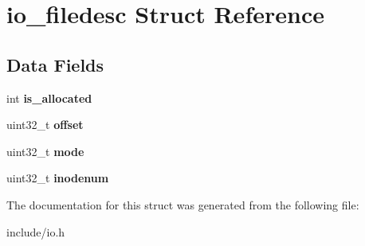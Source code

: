 \hypertarget{structio__filedesc}{}\section{io\+\_\+filedesc Struct Reference}
\label{structio__filedesc}
\subsection*{Data Fields}
\begin{DoxyCompactItemize}
\item 
\mbox{\label{structio__filedesc_a04fd1f3c067f07d766eb7dfc911f2d34}} 
int {\bfseries is\+\_\+allocated}
\item 
\mbox{\label{structio__filedesc_ab6eb4afe9fdf77335abc389b746dec3d}} 
uint32\+\_\+t {\bfseries offset}
\item 
\mbox{\label{structio__filedesc_a77abd3c604148445f40a364a52e45287}} 
uint32\+\_\+t {\bfseries mode}
\item 
\mbox{\label{structio__filedesc_a86cc912dd7fdb83bce629a80bf6b826e}} 
uint32\+\_\+t {\bfseries inodenum}
\end{DoxyCompactItemize}


The documentation for this struct was generated from the following file\+:\begin{DoxyCompactItemize}
\item 
include/io.\+h\end{DoxyCompactItemize}
